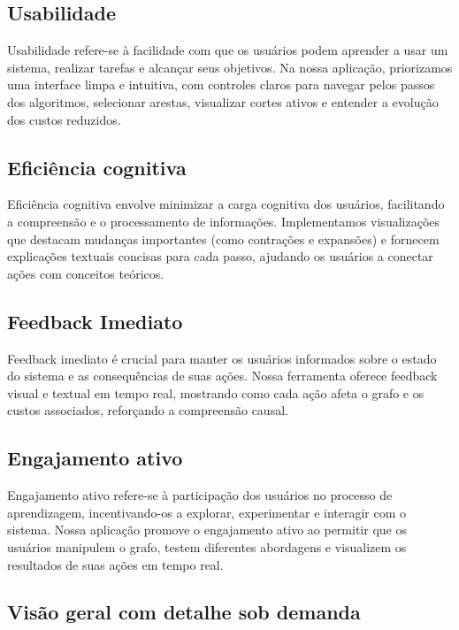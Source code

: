 \subsection{Usabilidade}

Usabilidade refere-se à facilidade com que os usuários podem aprender a usar um sistema, realizar tarefas e alcançar seus objetivos. Na nossa aplicação, priorizamos uma interface limpa e intuitiva, com controles claros para navegar pelos passos dos algoritmos, selecionar arestas, visualizar cortes ativos e entender a evolução dos custos reduzidos.

\subsection{Eficiência cognitiva}

Eficiência cognitiva envolve minimizar a carga cognitiva dos usuários, facilitando a compreensão e o processamento de informações. Implementamos visualizações que destacam mudanças importantes (como contrações e expansões) e fornecem explicações textuais concisas para cada passo, ajudando os usuários a conectar ações com conceitos teóricos.

\subsection{Feedback Imediato}

Feedback imediato é crucial para manter os usuários informados sobre o estado do sistema e as consequências de suas ações. Nossa ferramenta oferece feedback visual e textual em tempo real, mostrando como cada ação afeta o grafo e os custos associados, reforçando a compreensão causal.

\subsection{Engajamento ativo}

Engajamento ativo refere-se à participação dos usuários no processo de aprendizagem, incentivando-os a explorar, experimentar e interagir com o sistema. Nossa aplicação promove o engajamento ativo ao permitir que os usuários manipulem o grafo, testem diferentes abordagens e visualizem os resultados de suas ações em tempo real.


\subsection{Visão geral com detalhe sob demanda}

